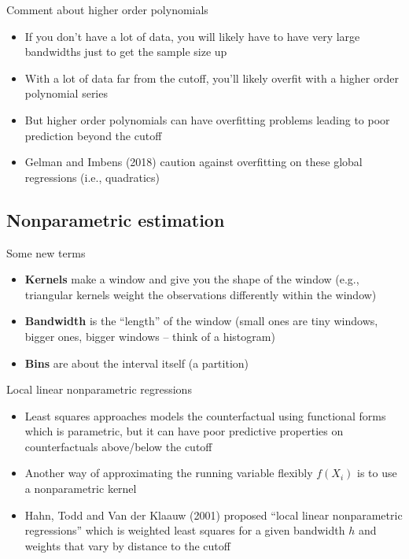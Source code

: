 \documentclass{beamer}
\begin{document}
\begin{frame}{Comment about higher order polynomials}

\begin{itemize}
\item If you don't have a lot of data, you will likely have to have very large bandwidths just to get the sample size up
\item With a lot of data far from the cutoff, you'll likely overfit with a higher order polynomial series
\item But higher order polynomials can have overfitting problems leading to poor prediction beyond the cutoff 
\item Gelman and Imbens (2018) caution against overfitting on these global regressions (i.e., quadratics) 

\end{itemize}

\end{frame}





\subsection{Nonparametric estimation}

\begin{frame}{Some new terms}

\begin{itemize}

\item \textbf{Kernels} make a window and give you the shape of the window (e.g., triangular kernels weight the observations differently within the window)
\item \textbf{Bandwidth} is the ``length'' of the window (small ones are tiny windows, bigger ones, bigger windows -- think of a histogram)
\item \textbf{Bins} are about the interval itself (a partition)

\end{itemize}

\end{frame}




\begin{frame}{Local linear nonparametric regressions}

\begin{itemize}
\item Least squares approaches models the counterfactual using functional forms which is parametric, but it can have poor predictive properties on counterfactuals above/below the cutoff
\item Another way of approximating the running variable flexibly $f(X_i)$ is to use a nonparametric kernel 
\item Hahn, Todd and Van der Klaauw (2001) proposed ``local linear nonparametric regressions'' which is weighted least squares for a given bandwidth $h$ and weights that vary by distance to the cutoff
\end{itemize}

\end{frame}
\end{document}
